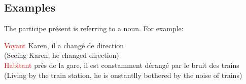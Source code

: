 \documentclass{book}
\begin{document}
        \subsection{Examples}
            The participe présent is referring to a noun. For example:
            \begin{center}
                \textcolor{red}{Voyant} Karen, il a changé de direction \\
                (Seeing Karen, he changed direction) \\
                \textcolor{red}{Habitant} près de la gare, il est constamment dérangé par le bruit des trains \\
                (Living by the train station, he is onstantlly bothered by the noise of trains)
            \end{center}
\end{document}
